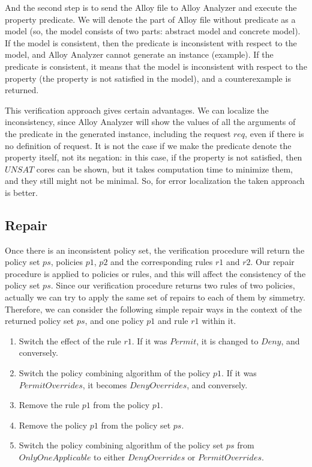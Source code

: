 \documentclass{acm_proc_article-sp}
\begin{document}
And the second step is to send the Alloy file to Alloy Analyzer and execute the property predicate. We will denote the part of Alloy file without predicate as a model (so, the model consists of two parts: abstract model and concrete model). If the model is consistent, then the predicate is inconsistent with respect to the model, and Alloy Analyzer cannot generate an instance (example). If the predicate is consistent, it means that the model is inconsistent with respect to the property (the property is not satisfied in the model), and a counterexample is returned.

This verification approach gives certain advantages. We can localize the inconsistency, since Alloy Analyzer will show the values of all the arguments of the predicate in the generated instance, including the request $req$, even if there is no definition of request. It is not the case if we make the predicate denote the property itself, not its negation: in this case, if the property is not satisfied, then $UNSAT$ cores can be shown, but it takes computation time to minimize them, and they still might not be minimal. So, for error localization the taken approach is better.

\subsection{Repair}

Once there is an inconsistent policy set, the verification procedure will return the policy set $ps$, policies $p1$, $p2$ and the corresponding rules $r1$ and $r2$. Our repair procedure is applied to policies or rules, and this will affect the consistency of the policy set $ps$. Since our verification procedure returns two rules of two policies, actually we can try to apply the same set of repairs to each of them by simmetry. Therefore, we can consider the following simple repair ways in the context of the returned policy set $ps$, and one policy $p1$ and rule $r1$ within it.

\begin{enumerate}
\item Switch the effect of the rule $r1$. If it was $Permit$, it is changed to $Deny$, and conversely.
\item Switch the policy combining algorithm of the policy $p1$. If it was $PermitOverrides$, it becomes $DenyOverrides$, and conversely.
\item Remove the rule $p1$ from the policy $p1$.
\item Remove the policy $p1$ from the policy set $ps$.
\item Switch the policy combining algorithm of the policy set $ps$ from $OnlyOneApplicable$ to either $DenyOverrides$ or $PermitOverrides$.
\end{enumerate}
\end{document}
